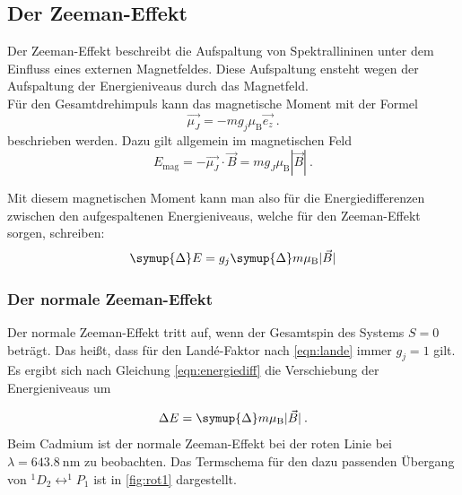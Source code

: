 \subsection{Der Zeeman-Effekt}

Der Zeeman-Effekt beschreibt die Aufspaltung von Spektrallininen unter dem Einfluss eines externen Magnetfeldes. Diese Aufspaltung ensteht wegen der Aufspaltung der Energieniveaus durch das Magnetfeld. \\
Für den Gesamtdrehimpuls kann das magnetische Moment mit der Formel
\begin{equation}
    \vec{\mu_J} = - m g_j \mu_\text{B} \vec{e_z} \ .
\end{equation}
beschrieben werden. Dazu gilt allgemein im magnetischen Feld 
\begin{equation}
    E_\text{mag} = - \vec{\mu_J} \cdot \vec{B} = m g_J \mu_\text{B} |\vec{B}| \: .
    \label{eqn:energie}
\end{equation} 

Mit diesem magnetischen Moment kann man also für die Energiedifferenzen zwischen den aufgespaltenen Energieniveaus, welche für den Zeeman-Effekt sorgen, schreiben: 
\begin{equation}
    \symup{\Delta} E = g_j \symup{\Delta} m \mu_\text{B} \lvert \vec{B} \rvert 
    \label{eqn:energiediff}
\end{equation}


\subsubsection{Der normale Zeeman-Effekt}

Der normale Zeeman-Effekt tritt auf, wenn der Gesamtspin des Systems $S = 0$ beträgt. Das heißt, dass für den Landé-Faktor nach \autoref{eqn:lande} immer $g_j = 1$ gilt.
Es ergibt sich nach Gleichung \eqref{eqn:energiediff} die Verschiebung der Energieniveaus um

\begin{equation}
    \Delta E = \symup{\Delta} m \mu_\text{B} |\vec{B}|\: .
\end{equation}
\newline
\noindent
Beim Cadmium ist der normale Zeeman-Effekt bei der roten Linie bei $\lambda = \SI{643.8}{\nano\meter}$ zu beobachten. Das Termschema für den dazu passenden Übergang von $^1D_2 \leftrightarrow ^1P_1$ ist in \autoref{fig:rot1} dargestellt.

